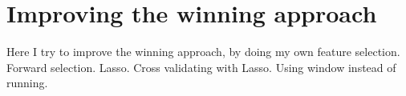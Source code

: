\chapter{Improving the winning approach}
Here I try to improve the winning approach, by doing my own feature selection. Forward selection. Lasso. Cross validating with Lasso. Using window instead of running.
